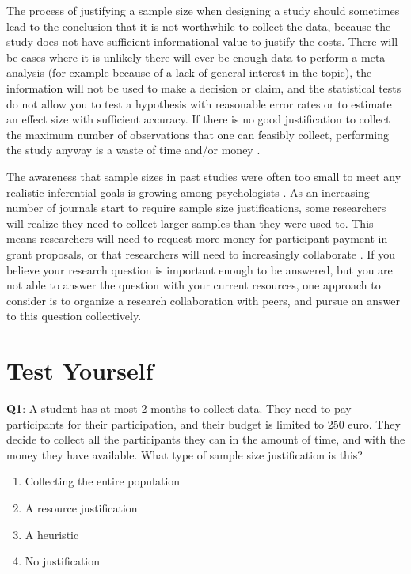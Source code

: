 \documentclass[
  oneside]{book}
\providecommand{\tightlist}{%
  \setlength{\itemsep}{0pt}\setlength{\parskip}{0pt}}
\begin{document}
The process of justifying a sample size when designing a study should sometimes lead to the conclusion that it is not worthwhile to collect the data, because the study does not have sufficient informational value to justify the costs. There will be cases where it is unlikely there will ever be enough data to perform a meta-analysis (for example because of a lack of general interest in the topic), the information will not be used to make a decision or claim, and the statistical tests do not allow you to test a hypothesis with reasonable error rates or to estimate an effect size with sufficient accuracy. If there is no good justification to collect the maximum number of observations that one can feasibly collect, performing the study anyway is a waste of time and/or money \citep{button_power_2013, brown_errors_1983, halpern_continuing_2002}.

The awareness that sample sizes in past studies were often too small to meet any realistic inferential goals is growing among psychologists \citep{lindsay_replication_2015, sedlmeier_studies_1989, fraley_n-pact_2014, button_power_2013}. As an increasing number of journals start to require sample size justifications, some researchers will realize they need to collect larger samples than they were used to. This means researchers will need to request more money for participant payment in grant proposals, or that researchers will need to increasingly collaborate \citep{moshontz_psychological_2018}. If you believe your research question is important enough to be answered, but you are not able to answer the question with your current resources, one approach to consider is to organize a research collaboration with peers, and pursue an answer to this question collectively.

\hypertarget{test-yourself-6}{%
\section{Test Yourself}\label{test-yourself-6}}

\textbf{Q1}: A student has at most 2 months to collect data. They need to pay participants for their participation, and their budget is limited to 250 euro. They decide to collect all the participants they can in the amount of time, and with the money they have available. What type of sample size justification is this?

\begin{enumerate}
\def\labelenumi{\Alph{enumi})}
\tightlist
\item
  Collecting the entire population
\item
  A resource justification
\item
  A heuristic
\item
  No justification
\end{enumerate}
\end{document}
